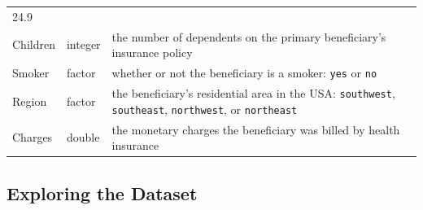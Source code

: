 \documentclass[
]{article}
\begin{document}
\begin{longtable}[]{@{}lll@{}}
\begin{minipage}[t]{0.46\columnwidth}
24.9\strut
\end{minipage}\tabularnewline
\begin{minipage}[t]{0.27\columnwidth}\raggedright
Children\strut
\end{minipage} & \begin{minipage}[t]{0.18\columnwidth}\raggedright
integer\strut
\end{minipage} & \begin{minipage}[t]{0.46\columnwidth}\raggedright
the number of dependents on the primary beneficiary's insurance
policy\strut
\end{minipage}\tabularnewline
\begin{minipage}[t]{0.27\columnwidth}\raggedright
Smoker\strut
\end{minipage} & \begin{minipage}[t]{0.18\columnwidth}\raggedright
factor\strut
\end{minipage} & \begin{minipage}[t]{0.46\columnwidth}\raggedright
whether or not the beneficiary is a smoker: \texttt{yes} or
\texttt{no}\strut
\end{minipage}\tabularnewline
\begin{minipage}[t]{0.27\columnwidth}\raggedright
Region\strut
\end{minipage} & \begin{minipage}[t]{0.18\columnwidth}\raggedright
factor\strut
\end{minipage} & \begin{minipage}[t]{0.46\columnwidth}\raggedright
the beneficiary's residential area in the USA: \texttt{southwest},
\texttt{southeast}, \texttt{northwest}, or \texttt{northeast}\strut
\end{minipage}\tabularnewline
\begin{minipage}[t]{0.27\columnwidth}\raggedright
Charges\strut
\end{minipage} & \begin{minipage}[t]{0.18\columnwidth}\raggedright
double\strut
\end{minipage} & \begin{minipage}[t]{0.46\columnwidth}\raggedright
the monetary charges the beneficiary was billed by health
insurance\strut
\end{minipage}\tabularnewline
\bottomrule
\end{longtable}

\hypertarget{exploring-the-dataset}{%
\subsection{Exploring the Dataset}\label{exploring-the-dataset}}
\end{document}
